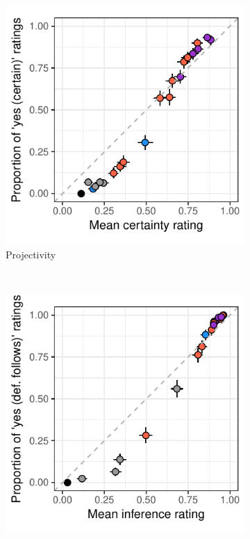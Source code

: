 \documentclass[11pt,fleqn]{article}
\newcommand{\6}{\mbox{$[\hspace*{-.6mm}[$}}
\newcommand{\9}{\mbox{$]\hspace*{-.6mm}]$}}
\begin{document}
{\begin{figure}[h!]
\begin{subfigure}{.33\textwidth}
\centering
\includegraphics[width=.25\paperwidth]{../results/compare-binary-nonbinary/graphs/projectivity}
\caption{Projectivity}
\end{subfigure}~\quad    
\begin{subfigure}{.33\textwidth}
\centering
\includegraphics[width=.25\paperwidth]{../results/compare-binary-nonbinary/graphs/entailment-inference}

\end{subfigure}
\end{figure}}
\end{document}
